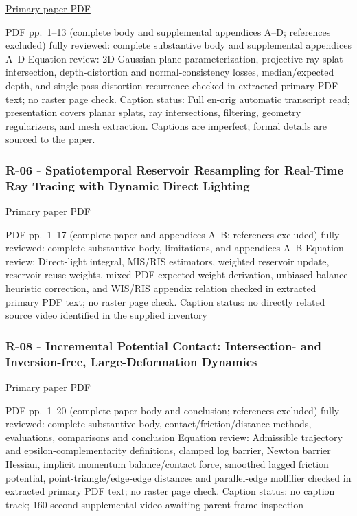 \href{https://arxiv.org/pdf/2403.17888}{Primary paper PDF}

PDF pp.~1--13 (complete body and supplemental appendices A--D; references excluded) fully reviewed: complete substantive body and supplemental appendices A--D Equation review: 2D Gaussian plane parameterization, projective ray-splat intersection, depth-distortion and normal-consistency losses, median/expected depth, and single-pass distortion recurrence checked in extracted primary PDF text; no raster page check. Caption status: Full en-orig automatic transcript read; presentation covers planar splats, ray intersections, filtering, geometry regularizers, and mesh extraction. Captions are imperfect; formal details are sourced to the paper.

\subsubsection{R-06 - Spatiotemporal Reservoir Resampling for Real-Time Ray Tracing with Dynamic Direct Lighting}\label{04-visual-computing-ii-ch036-r-06---spatiotemporal-reservoir-resampling-for-real-time-ray-tracing-with-dynamic-direct-lighting}

\href{https://benedikt-bitterli.me/restir/bitterli20restir.pdf}{Primary paper PDF}

PDF pp.~1--17 (complete paper and appendices A--B; references excluded) fully reviewed: complete substantive body, limitations, and appendices A--B Equation review: Direct-light integral, MIS/RIS estimators, weighted reservoir update, reservoir reuse weights, mixed-PDF expected-weight derivation, unbiased balance-heuristic correction, and WIS/RIS appendix relation checked in extracted primary PDF text; no raster page check. Caption status: no directly related source video identified in the supplied inventory

\subsubsection{R-08 - Incremental Potential Contact: Intersection- and Inversion-free, Large-Deformation Dynamics}\label{04-visual-computing-ii-ch036-r-08---incremental-potential-contact-intersection--and-inversion-free-large-deformation-dynamics}

\href{https://ipc-sim.github.io/file/IPC-paper-350ppi.pdf}{Primary paper PDF}

PDF pp.~1--20 (complete paper body and conclusion; references excluded) fully reviewed: complete substantive body, contact/friction/distance methods, evaluations, comparisons and conclusion Equation review: Admissible trajectory and epsilon-complementarity definitions, clamped log barrier, Newton barrier Hessian, implicit momentum balance/contact force, smoothed lagged friction potential, point-triangle/edge-edge distances and parallel-edge mollifier checked in extracted primary PDF text; no raster page check. Caption status: no caption track; 160-second supplemental video awaiting parent frame inspection

